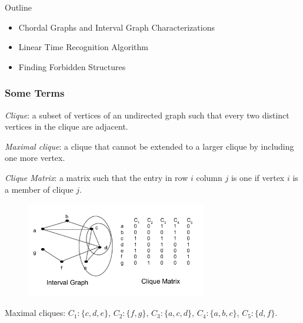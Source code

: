 \documentclass{beamer}
\begin{document}
\begin{frame}{Outline}
\begin{itemize}
    \item Chordal Graphs and Interval Graph Characterizations
    \vspace{0.2in}
    \item Linear Time Recognition Algorithm
    \vspace{0.2in}
    \item Finding Forbidden Structures
\end{itemize}
\end{frame}
   

\begin{frame}
	\frametitle{Some Terms}
	\emph{Clique}: a subset of vertices of an undirected graph such that every two distinct vertices in the clique are adjacent.
	
	\vspace{0.1in}
	
	\emph{Maximal clique}: a clique that cannot be extended to a larger clique by including one more vertex.
	
	\vspace{0.1in}
	
	\emph{Clique Matrix}: a matrix such that the entry in row $i$ column $j$ is one if vertex $i$ is a member of clique $j$.
	
	
	\begin{figure}
		\includegraphics[width = 0.7\textwidth,height = 0.35\textheight]{figures/clique_matrix.pdf}
	\end{figure}
	Maximal cliques: $C_1: \{c,d,e\}$, $C_2: \{f,g\}$, $C_3: \{a,c,d\}$, $C_4: \{a,b,c\}$, $C_5: \{d,f\}.$
\end{frame}
\end{document}
